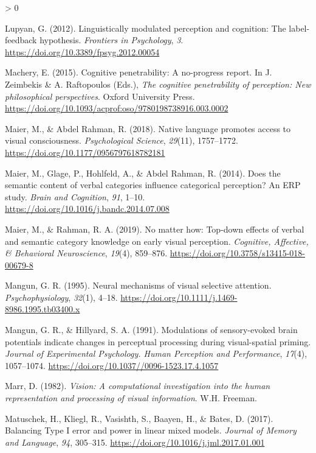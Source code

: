 \documentclass[
  english,
  man,12pt,twoside]{apa7}
\newlength{\cslhangindent}
\newenvironment{CSLReferences}[2] %
 {%
  \setlength{\parindent}{0pt}
  \ifodd #1 \everypar{\setlength{\hangindent}{\cslhangindent}}\ignorespaces\fi
  \ifnum #2 > 0
  \setlength{\parskip}{#2\baselineskip}
  \fi
 }%
 {}
\begin{document}
\begin{CSLReferences}{1}{0}
\leavevmode\hypertarget{ref-lupyan2012}{}%
Lupyan, G. (2012). Linguistically modulated perception and cognition: The label-feedback hypothesis. \emph{Frontiers in Psychology}, \emph{3}. \url{https://doi.org/10.3389/fpsyg.2012.00054}

\leavevmode\hypertarget{ref-machery2015}{}%
Machery, E. (2015). Cognitive penetrability: A no-progress report. In J. Zeimbekis \& A. Raftopoulos (Eds.), \emph{The cognitive penetrability of perception: New philosophical perspectives}. Oxford University Press. \url{https://doi.org/10.1093/acprof:oso/9780198738916.003.0002}

\leavevmode\hypertarget{ref-maier2018}{}%
Maier, M., \& Abdel Rahman, R. (2018). Native language promotes access to visual consciousness. \emph{Psychological Science}, \emph{29}(11), 1757--1772. \url{https://doi.org/10.1177/0956797618782181}

\leavevmode\hypertarget{ref-maier2014}{}%
Maier, M., Glage, P., Hohlfeld, A., \& Abdel Rahman, R. (2014). Does the semantic content of verbal categories influence categorical perception? An {ERP} study. \emph{Brain and Cognition}, \emph{91}, 1--10. \url{https://doi.org/10.1016/j.bandc.2014.07.008}

\leavevmode\hypertarget{ref-maier2019}{}%
Maier, M., \& Rahman, R. A. (2019). No matter how: Top-down effects of verbal and semantic category knowledge on early visual perception. \emph{Cognitive, Affective, \& Behavioral Neuroscience}, \emph{19}(4), 859--876. \url{https://doi.org/10.3758/s13415-018-00679-8}

\leavevmode\hypertarget{ref-mangun1995}{}%
Mangun, G. R. (1995). Neural mechanisms of visual selective attention. \emph{Psychophysiology}, \emph{32}(1), 4--18. \url{https://doi.org/10.1111/j.1469-8986.1995.tb03400.x}

\leavevmode\hypertarget{ref-mangun1991}{}%
Mangun, G. R., \& Hillyard, S. A. (1991). Modulations of sensory-evoked brain potentials indicate changes in perceptual processing during visual-spatial priming. \emph{Journal of Experimental Psychology. Human Perception and Performance}, \emph{17}(4), 1057--1074. \url{https://doi.org/10.1037//0096-1523.17.4.1057}

\leavevmode\hypertarget{ref-marr1982}{}%
Marr, D. (1982). \emph{Vision: A computational investigation into the human representation and processing of visual information}. W.H. Freeman.

\leavevmode\hypertarget{ref-matuschek2017}{}%
Matuschek, H., Kliegl, R., Vasishth, S., Baayen, H., \& Bates, D. (2017). Balancing {Type I} error and power in linear mixed models. \emph{Journal of Memory and Language}, \emph{94}, 305--315. \url{https://doi.org/10.1016/j.jml.2017.01.001}


\end{CSLReferences}
\end{document}
